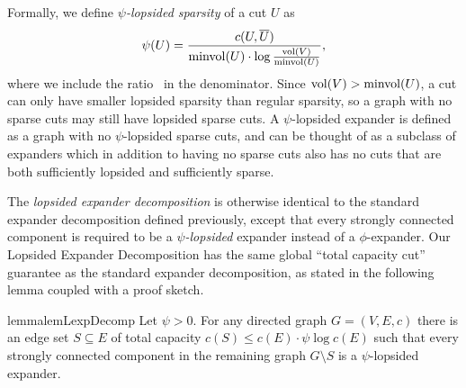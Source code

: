 \documentclass[letterpaper,11pt]{article}
\begin{document}
Formally, we define \emph{$\psi$-lopsided sparsity} of a cut $U$ as 
\begin{align*}
	\psi(U) = \frac{c(U, \overline U)}{\operatorname{minvol}(U) \cdot \log \frac{\operatorname{vol}(V)}{\operatorname{minvol}(U)}},
\end{align*}
where we include the ratio~ in the denominator. Since $\operatorname{vol}(V)>\operatorname{minvol}(U)$, a cut can only have smaller lopsided sparsity than regular sparsity, so a graph with no sparse cuts may still have lopsided sparse cuts. A $\psi$-lopsided expander is defined as a graph with no $\psi$-lopsided sparse cuts, and can be thought of as a subclass of expanders which in addition to having no sparse cuts also has no cuts that are both sufficiently lopsided and sufficiently sparse.

The \emph{lopsided expander decomposition} is otherwise identical to the standard expander decomposition defined previously, except that every strongly connected component is required to be a \emph{$\psi$-lopsided} expander instead of a $\phi$-expander. Our Lopsided Expander Decomposition has the same global ``total capacity cut'' guarantee as the standard expander decomposition, as stated in the following lemma coupled with a proof sketch.

\begin{restatable}{lemma}{lemLexpDecomp} \label{lem:lexp-decomp}
	Let $\psi > 0$. For any directed graph $G = (V, E, c)$ there is an edge set $S \subseteq E$ of total capacity $c(S) \leq c(E) \cdot \psi \log c(E)$ such that every strongly connected component in the remaining graph $G \setminus S$ is a $\psi$-lopsided expander.
\end{restatable}
\end{document}
